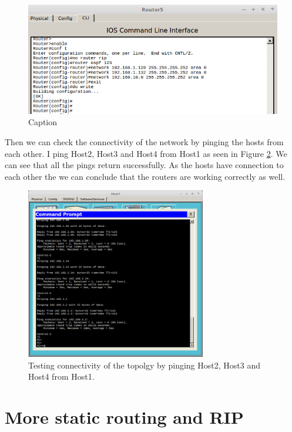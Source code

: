 \documentclass{article}
\begin{document}
\begin{figure}[!h]
    \centering
    \includegraphics[width=\textwidth]{4ospfconf}
    \caption{Caption}
    \label{fig:4ospfconf}
\end{figure}

Then we can check the connectivity of the network by pinging the hosts from each other. I ping Host2, Host3 and Host4 from Host1 as seen in Figure \ref{fig:4pingcon}. We can see that all the pings return successfully. As the hosts have connection to each other the we can conclude that the routers are working correctly as well. 

\begin{figure}[h]
    \centering
    \includegraphics[width=0.7\textwidth]{4pingcon}
    \caption{Testing connectivity of the topolgy by pinging Host2, Host3 and Host4 from Host1.}
    \label{fig:4pingcon}
\end{figure}

\section{More static routing and RIP}
\end{document}
